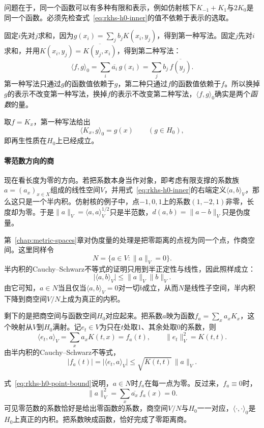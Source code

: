 问题在于，同一个函数可以有多种有限和表示，例如仿射核下$K_{-1}+K_1$与$2K_0$是同一个函数。必须先检查式~\eqref{eq:rkhs-h0-inner}的值不依赖于表示的选取。

固定$i$先对$j$求和，因为$g(x_i)=\sum_jb_jK(x_i,y_j)$，得到第一种写法。固定$j$先对$i$求和，并用$K(x_i,y_j)=\overline{K(y_j,x_i)}$，得到第二种写法：
\[
\langle f,g\rangle_0=\sum_i\overline{a_i}\,g(x_i)
=\sum_jb_j\,\overline{f(y_j)} .
\]
第一种写法只通过$g$的函数值依赖于$g$，第二种只通过$f$的函数值依赖于$f$。所以换掉$g$的表示不改变第一种写法，换掉$f$的表示不改变第二种写法，$\langle f,g\rangle_0$确实是两个\emph{函数}的量。

取$f=K_x$，第一种写法给出
\begin{equation}
\langle K_x,g\rangle_0=g(x)\qquad(g\in H_0),
\label{eq:rkhs-h0-reproducing}
\end{equation}
即再生性质在$H_0$上已经成立。

\paragraph{零范数方向的商}

现在看长度为零的方向。若把系数本身当作对象，即考虑有限支撑的系数族$a=(a_x)_{x\in X}$组成的线性空间$V$，并用式~\eqref{eq:rkhs-h0-inner}的右端定义$\langle a,b\rangle_V$，那么这只是一个半内积。仿射核的例子中，点$-1,0,1$上的系数$(1,-2,1)$非零，长度却为零。于是$\lVert a\rVert_V=\langle a,a\rangle_V^{1/2}$只是半范数，$d(a,b)=\lVert a-b\rVert_V$只是伪度量。

第~\ref{chap:metric-spaces}章对伪度量的处理是把零距离的点视为同一个点，作商空间。这里同样令
\[
N=\{a\in V:\lVert a\rVert_V=0\}.
\]
半内积的Cauchy--Schwarz不等式的证明只用到半正定性与线性，因此照样成立：
\[
\lvert\langle a,b\rangle_V\rvert\leq\lVert a\rVert_V\lVert b\rVert_V .
\]
由它可知，$a\in N$当且仅当$\langle a,b\rangle_V=0$对一切$b$成立，从而$N$是线性子空间，半内积下降到商空间$V/N$上成为真正的内积。

剩下的是把商空间与函数空间$H_0$对应起来。把系数$a$映为函数$f_a=\sum_xa_xK_x$，这个映射从$V$到$H_0$满射。记$e_t\in V$为只在$t$处取$1$、其余处取$0$的系数，则
\[
\langle e_t,a\rangle_V=\sum_xa_xK(t,x)=f_a(t),\qquad \lVert e_t\rVert_V^2=K(t,t).
\]
由半内积的Cauchy--Schwarz不等式，
\begin{equation}
\lvert f_a(t)\rvert=\lvert\langle e_t,a\rangle_V\rvert\leq\sqrt{K(t,t)}\,\lVert a\rVert_V .
\label{eq:rkhs-h0-point-bound}
\end{equation}

式~\eqref{eq:rkhs-h0-point-bound}说明，$a\in N$时$f_a$在每一点为零。反过来，$f_a\equiv0$时，
\[
\lVert a\rVert_V^2=\sum_x\overline{a_x}\,f_a(x)=0 .
\]
可见零范数的系数恰好是给出零函数的系数，商空间$V/N$与$H_0$一一对应，$\langle\cdot,\cdot\rangle_0$是$H_0$上真正的内积。把系数映成函数，恰好完成了零距离商。

